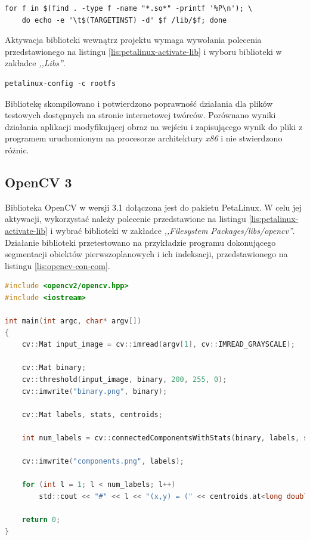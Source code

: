 \begin{lstlisting}[breaklines=true]
for f in $(find . -type f -name "*.so*" -printf '%P\n'); \
	do echo -e '\t$(TARGETINST) -d' $f /lib/$f; done
\end{lstlisting}

Aktywacja biblioteki wewnątrz projektu wymaga wywołania polecenia przedstawionego na listingu \ref{lis:petalinux-activate-lib} i wyboru biblioteki w zakładce \textit{,,Libs''}. 

\begin{lstlisting}[caption=Dołączenie biblioteki do projektu PetaLinux., label=lis:petalinux-activate-lib]
petalinux-config -c rootfs
\end{lstlisting}


Bibliotekę skompilowano i potwierdzono poprawność działania dla plików testowych dostępnych na stronie internetowej twórców. Porównano wyniki działania aplikacji modyfikującej obraz na wejściu i zapisującego wynik do pliki z programem uruchomionym na procesorze architektury \emph{x86} i nie stwierdzono różnic.

\subsection{OpenCV 3}
Biblioteka OpenCV w wersji 3.1 dołączona jest do pakietu PetaLinux. 
W celu jej aktywacji, wykorzystać należy polecenie przedstawione na listingu \ref{lis:petalinux-activate-lib} i wybrać biblioteki w zakładce \emph{,,Filesystem Packages/libs/opencv''}.
Działanie biblioteki przetestowano na przykładzie programu dokonującego segmentacji obiektów pierwszoplanowych i ich indeksacji, przedstawionego na listingu \ref{lis:opencv-con-com}.

\begin{lstlisting}[language=C, breaklines=true, label=lis:opencv-con-com, caption=Aplikacja indeksująca obiekty pierwszoplanowe.]
#include <opencv2/opencv.hpp>
#include <iostream>

int main(int argc, char* argv[])
{
	cv::Mat input_image = cv::imread(argv[1], cv::IMREAD_GRAYSCALE);
	
	cv::Mat binary;
	cv::threshold(input_image, binary, 200, 255, 0);
	cv::imwrite("binary.png", binary);
	
	cv::Mat labels, stats, centroids;
	
	int num_labels = cv::connectedComponentsWithStats(binary, labels, stats, centroids);
	
	cv::imwrite("components.png", labels);
	
	for (int l = 1; l < num_labels; l++)
		std::cout << "#" << l << "(x,y) = (" << centroids.at<long double>(l, 0) << ", " << centroids.at<long double>(l, 1) << ")" << std::endl;
	
	return 0;
}
\end{lstlisting}
